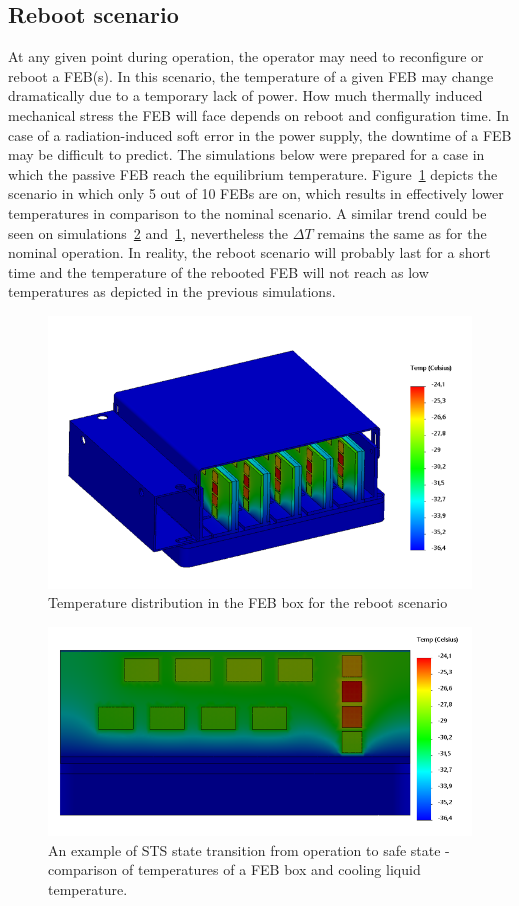 \subsection{Reboot scenario}
\label{reboot}
At any given point during operation, the operator may need to reconfigure or reboot a \gls{FEB}(s). In this scenario, the temperature of a given \gls{FEB} may change dramatically due to a temporary lack of power. How much thermally induced mechanical stress the \gls{FEB} will face depends on reboot and configuration time. In case of a radiation-induced soft error in the power supply, the downtime of a \gls{FEB} may be difficult to predict. The simulations below were prepared for a case in which the passive \gls{FEB} reach the equilibrium temperature. Figure~\ref{fig_reboot_box} depicts the scenario in which only 5 out of 10 \glspl{FEB} are on, which results in effectively lower temperatures in comparison to the nominal scenario. A similar trend could be seen on simulations~\ref{fig_reboot_FEB} and~\ref{fig_reboot_box}, nevertheless the $\Delta T$ remains the same as for the nominal operation. In reality, the reboot scenario will probably last for a short time and the temperature of the rebooted \gls{FEB} will not reach as low temperatures as depicted in the previous simulations.



\begin{figure}[!h]
\centering
\includegraphics[width=0.6\columnwidth]{Chapter4/images/reboot_box.png}
\caption{Temperature distribution in the \gls{FEB} box for the reboot scenario}
\label{fig_reboot_box}
\end{figure}

\begin{figure}[!h]
\centering
\includegraphics[width=0.6\columnwidth]{Chapter4/images/reboot_FEB.png}
\caption{An example of \gls{STS} state transition from operation to safe state - comparison of temperatures of a \gls{FEB} box and cooling liquid temperature.}
\label{fig_reboot_FEB}
\end{figure}

